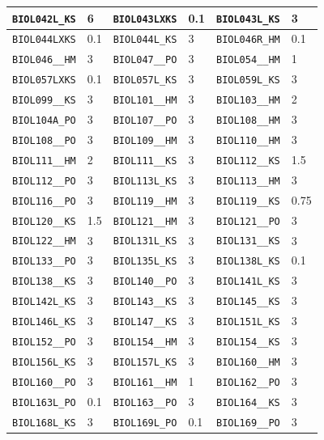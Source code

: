 \begin{longtable}{|l|l||l|l||l|l|}
    \verb|BIOL042L_KS| & 6 & \verb|BIOL043LXKS| & 0.1 & \verb|BIOL043L_KS| & 3\\\hline
    \verb|BIOL044LXKS| & 0.1 & \verb|BIOL044L_KS| & 3 & \verb|BIOL046R_HM| & 0.1\\\hline
    \verb|BIOL046__HM| & 3 & \verb|BIOL047__PO| & 3 & \verb|BIOL054__HM| & 1\\\hline
    \verb|BIOL057LXKS| & 0.1 & \verb|BIOL057L_KS| & 3 & \verb|BIOL059L_KS| & 3\\\hline
    \verb|BIOL099__KS| & 3 & \verb|BIOL101__HM| & 3 & \verb|BIOL103__HM| & 2\\\hline
    \verb|BIOL104A_PO| & 3 & \verb|BIOL107__PO| & 3 & \verb|BIOL108__HM| & 3\\\hline
    \verb|BIOL108__PO| & 3 & \verb|BIOL109__HM| & 3 & \verb|BIOL110__HM| & 3\\\hline
    \verb|BIOL111__HM| & 2 & \verb|BIOL111__KS| & 3 & \verb|BIOL112__KS| & 1.5\\\hline
    \verb|BIOL112__PO| & 3 & \verb|BIOL113L_KS| & 3 & \verb|BIOL113__HM| & 3\\\hline
    \verb|BIOL116__PO| & 3 & \verb|BIOL119__HM| & 3 & \verb|BIOL119__KS| & 0.75\\\hline
    \verb|BIOL120__KS| & 1.5 & \verb|BIOL121__HM| & 3 & \verb|BIOL121__PO| & 3\\\hline
    \verb|BIOL122__HM| & 3 & \verb|BIOL131L_KS| & 3 & \verb|BIOL131__KS| & 3\\\hline
    \verb|BIOL133__PO| & 3 & \verb|BIOL135L_KS| & 3 & \verb|BIOL138L_KS| & 0.1\\\hline
    \verb|BIOL138__KS| & 3 & \verb|BIOL140__PO| & 3 & \verb|BIOL141L_KS| & 3\\\hline
    \verb|BIOL142L_KS| & 3 & \verb|BIOL143__KS| & 3 & \verb|BIOL145__KS| & 3\\\hline
    \verb|BIOL146L_KS| & 3 & \verb|BIOL147__KS| & 3 & \verb|BIOL151L_KS| & 3\\\hline
    \verb|BIOL152__PO| & 3 & \verb|BIOL154__HM| & 3 & \verb|BIOL154__KS| & 3\\\hline
    \verb|BIOL156L_KS| & 3 & \verb|BIOL157L_KS| & 3 & \verb|BIOL160__HM| & 3\\\hline
    \verb|BIOL160__PO| & 3 & \verb|BIOL161__HM| & 1 & \verb|BIOL162__PO| & 3\\\hline
    \verb|BIOL163L_PO| & 0.1 & \verb|BIOL163__PO| & 3 & \verb|BIOL164__KS| & 3\\\hline
    \verb|BIOL168L_KS| & 3 & \verb|BIOL169L_PO| & 0.1 & \verb|BIOL169__PO| & 3\\\hline

\end{longtable}
